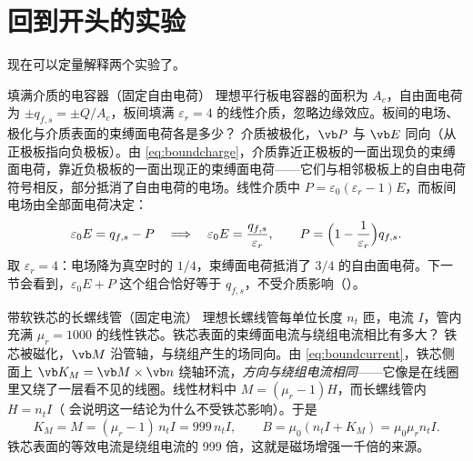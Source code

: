 \section{回到开头的实验}\label{sec:matter-puzzle-solved}

现在可以定量解释两个实验了。

\begin{example}{填满介质的电容器（固定自由电荷）}\label{ex:dielectriccap}
理想平行板电容器的面积为 $A_c$，自由面电荷为 $\pm q_{f,s}=\pm Q/A_c$，板间填满 $\varepsilon_r=4$ 的线性介质，忽略边缘效应。板间的电场、极化与介质表面的束缚面电荷各是多少？
\solution
介质被极化，$\vb P$ 与 $\vb E$ 同向（从正极板指向负极板）。由 \eqref{eq:boundcharge}，介质靠近正极板的一面出现负的束缚面电荷，靠近负极板的一面出现正的束缚面电荷——它们与相邻极板上的自由电荷符号相反，部分抵消了自由电荷的电场。线性介质中 $P=\varepsilon_0(\varepsilon_r-1)E$，而板间电场由全部面电荷决定：
\begin{equation*}
\varepsilon_0E=q_{f,s}-P\quad\Longrightarrow\quad
\varepsilon_0E=\frac{q_{f,s}}{\varepsilon_r},\qquad P=\Bigl(1-\frac{1}{\varepsilon_r}\Bigr)q_{f,s}.
\end{equation*}
取 $\varepsilon_r=4$：电场降为真空时的 $1/4$，束缚面电荷抵消了 $3/4$ 的自由面电荷。下一节会看到，$\varepsilon_0E+P$ 这个组合恰好等于 $q_{f,s}$，不受介质影响（）。
\end{example}


\begin{example}{带软铁芯的长螺线管（固定电流）}\label{ex:ironcore}
理想长螺线管每单位长度 $n_t$ 匝，电流 $I$，管内充满 $\mu_r=1000$ 的线性铁芯。铁芯表面的束缚面电流与绕组电流相比有多大？
\solution
铁芯被磁化，$\vb M$ 沿管轴，与绕组产生的场同向。由 \eqref{eq:boundcurrent}，铁芯侧面上 $\vb K_M=\vb M\times\vb n$ 绕轴环流，\emph{方向与绕组电流相同}——它像是在线圈里又绕了一层看不见的线圈。线性材料中 $M=(\mu_r-1)H$，而长螺线管内 $H=n_tI$（ 会说明这一结论为什么不受铁芯影响）。于是
\begin{equation*}
K_M=M=(\mu_r-1)\,n_tI=999\,n_tI,\qquad B=\mu_0(n_tI+K_M)=\mu_0\mu_r n_tI.
\end{equation*}
铁芯表面的等效电流是绕组电流的 999 倍，这就是磁场增强一千倍的来源。
\end{example}

